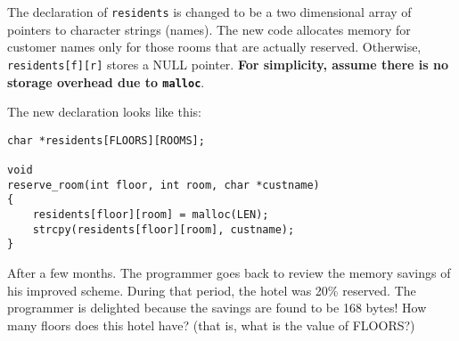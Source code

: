 The declaration of {\tt residents} is changed to be a two dimensional
array of pointers to character strings (names).  The new code
allocates memory for customer names only for those rooms that are
actually reserved. Otherwise, {\tt residents[f][r]} stores a {NULL}
pointer.  {\bf For simplicity, assume there is no storage overhead
due to {\tt malloc}}.

The new declaration looks like this:

\begin{verbatim}
char *residents[FLOORS][ROOMS];

void
reserve_room(int floor, int room, char *custname)
{
    residents[floor][room] = malloc(LEN);
    strcpy(residents[floor][room], custname);	
}
\end{verbatim}

After a few months. The programmer goes back to review the memory
savings of his improved scheme. During that period, the hotel was 20\%
reserved. The programmer is delighted because the savings are found to
be 168 bytes!  How many floors does this hotel have? (that is, what is
the value of FLOORS?)

\vspace{.4 in}
%
%
%
%
%


